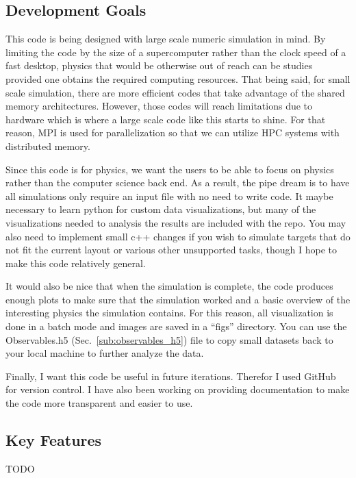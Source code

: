 \documentclass{article}
\begin{document}
\subsection{Development Goals} %
\label{sub:development_goals}
This code is being designed with large scale numeric simulation in mind. By limiting the code by the size of a supercomputer rather than the clock speed of a fast desktop, physics that would be otherwise out of reach can be studies provided one obtains the required computing resources. That being said, for small scale simulation, there are more efficient codes that take advantage of the shared memory architectures. However, those codes will reach limitations due to hardware which is where a large scale code like this starts to shine. For that reason, MPI is used for parallelization so that we can utilize HPC systems with distributed memory.

Since this code is for physics, we want the users to be able to focus on physics rather than the computer science back end. As a result, the pipe dream is to have all simulations only require an input file with no need to write code. It maybe necessary to learn python for custom data visualizations, but many of the visualizations needed to analysis the results are included with the repo. You may also need to implement small c++ changes if you wish to simulate targets that do not fit the current layout or various other unsupported tasks, though I hope to make this code relatively general.

It would also be nice that when the simulation is complete, the code produces enough plots to make sure that the simulation worked and a basic overview of the interesting physics the simulation contains. For this reason, all visualization is done in a batch mode and images are saved in a ``figs'' directory. You can use the Observables.h5 (Sec.~\ref{sub:observables_h5}) file to copy small datasets back to your local machine to further analyze the data.

Finally, I want this code be useful in future iterations. Therefor I used GitHub for version control. I have also been working on providing documentation to make the code more transparent and easier to use.

\subsection{Key Features} %
\label{sub:key_features}
TODO
\end{document}
